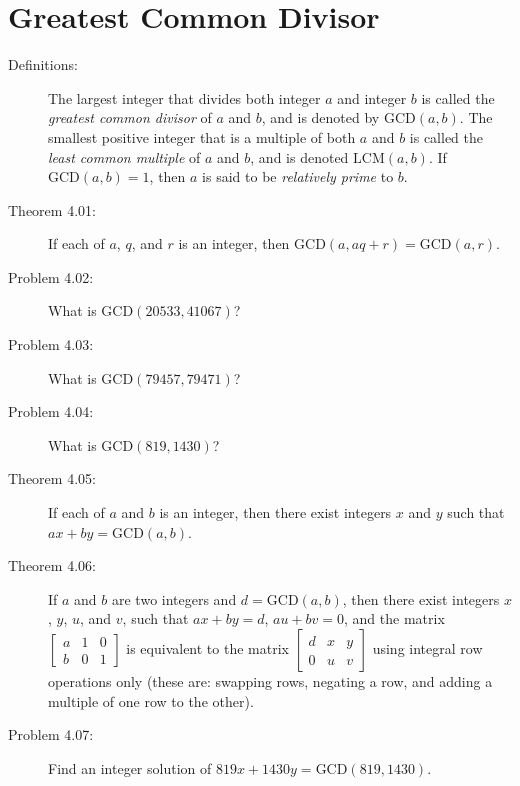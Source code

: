 \documentclass{article}
\begin{document}
\section{Greatest Common Divisor}

\begin{description}

  \item[Definitions:] The largest integer that divides both integer $a$ and integer $b$ is called the \emph{greatest common divisor} of $a$ and $b$, and is denoted by $\text{GCD}(a,b)$. The smallest positive integer that is a multiple of both $a$ and $b$ is called the \emph{least common multiple} of $a$ and $b$, and is denoted $\text{LCM}(a,b)$. If $\text{GCD}(a,b) = 1$, then $a$ is said to be \emph{relatively prime} to $b$.

  \item[Theorem 4.01:] If each of $a$, $q$, and $r$ is an integer, then $\text{GCD}(a,aq+r) = \text{GCD}(a,r)$.

  \item[Problem 4.02:] What is $\text{GCD}(20533, 41067)$?

  \item[Problem 4.03:] What is $\text{GCD}(79457, 79471)$?

  \item[Problem 4.04:] What is $\text{GCD}(819, 1430)$?

  \item[Theorem 4.05:] If each of $a$ and $b$ is an integer, then there exist integers $x$ and $y$ such that $ax+by = \text{GCD}(a,b)$.

  \item[Theorem 4.06:] If $a$ and $b$ are two integers and $d = \text{GCD}(a,b)$, then there exist integers $x$, $y$, $u$, and $v$, such that $ax+by=d$, $au+bv=0$, and the matrix $
    \begin{bmatrix}
      a & 1 & 0 \\
      b & 0 & 1
    \end{bmatrix}
    $ is equivalent to the matrix $
    \begin{bmatrix}
      d & x & y \\
      0 & u & v
    \end{bmatrix}
    $ using integral row operations only (these are: swapping rows, negating a row, and adding a multiple of one row to the other).

  \item[Problem 4.07:] Find an integer solution of $819x+1430y = \text{GCD}(819, 1430)$.


\end{description}
\end{document}
